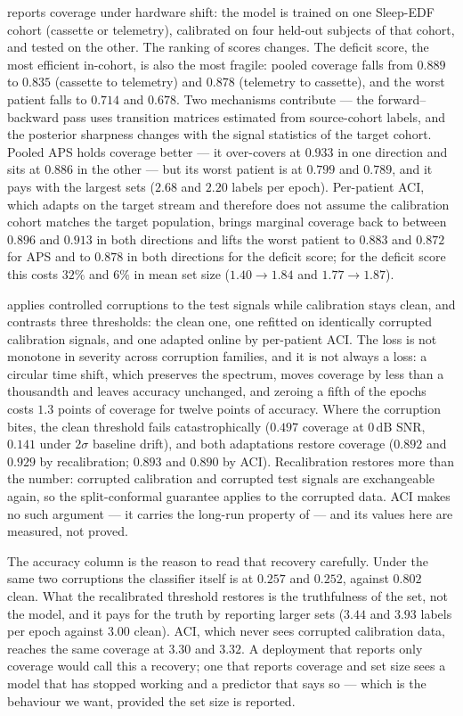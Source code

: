  reports coverage under hardware shift: the model is trained
on one Sleep-EDF cohort (cassette or telemetry), calibrated on four held-out
subjects of that cohort, and tested on the other. The ranking of scores
changes. The deficit score, the most efficient in-cohort, is also the most
fragile: pooled coverage falls from $0.889$ to $0.835$ (cassette to telemetry)
and $0.878$ (telemetry to cassette), and the worst patient falls to $0.714$
and $0.678$. Two mechanisms contribute --- the forward--backward pass uses
transition matrices estimated from source-cohort labels, and the posterior
sharpness changes with the signal statistics of the target cohort. Pooled APS
holds coverage better --- it over-covers at $0.933$ in one direction and sits
at $0.886$ in the other --- but its worst patient is at $0.799$ and $0.789$,
and it pays with the largest sets ($2.68$ and $2.20$ labels per epoch).
Per-patient ACI, which adapts on the target stream and therefore does not
assume the calibration cohort matches the target population, brings marginal
coverage back to between $0.896$ and $0.913$ in both directions and lifts the
worst patient to $0.883$ and $0.872$ for APS and to $0.878$ in both
directions for the deficit score; for the deficit score this costs $32\%$ and
$6\%$ in mean set size ($1.40\to1.84$ and $1.77\to1.87$).

 applies controlled corruptions to the test signals while
calibration stays clean, and contrasts three thresholds: the clean one, one
refitted on identically corrupted calibration signals, and one adapted online
by per-patient ACI. The loss is not monotone in severity across corruption
families, and it is not always a loss: a circular time shift, which preserves
the spectrum, moves coverage by less than a thousandth and leaves accuracy
unchanged, and zeroing a fifth of the epochs costs $1.3$ points of
coverage for twelve points of accuracy. Where the corruption bites, the clean
threshold fails catastrophically ($0.497$ coverage at $0\,\mathrm{dB}$ SNR,
$0.141$ under $2\sigma$ baseline drift), and both adaptations restore
coverage ($0.892$ and $0.929$ by recalibration; $0.893$ and $0.890$ by ACI).
Recalibration restores more than the number: corrupted calibration and
corrupted test signals are exchangeable again, so the split-conformal
guarantee applies to the corrupted data. ACI makes no such argument --- it
carries the long-run property of  --- and its values
here are measured, not proved.

The accuracy column is the reason to read that recovery carefully. Under the
same two corruptions the classifier itself is at $0.257$ and $0.252$, against
$0.802$ clean. What the recalibrated threshold restores is the truthfulness of
the set, not the model, and it pays for the truth by reporting larger sets
($3.44$ and $3.93$ labels per epoch against $3.00$ clean). ACI, which never
sees corrupted calibration data, reaches the same coverage at $3.30$ and
$3.32$. A deployment that reports only coverage would call this a recovery;
one that reports coverage and set size sees a model that has stopped working
and a predictor that says so --- which is the behaviour we want, provided the
set size is reported.

